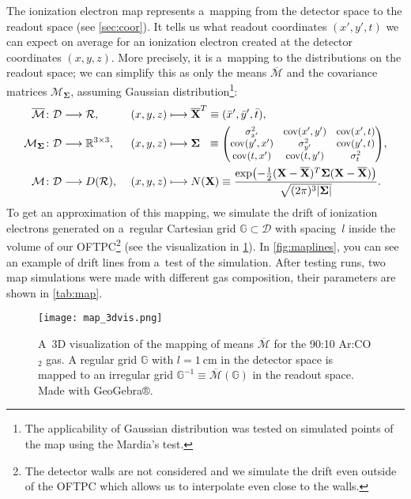 		The ionization electron map represents a~mapping from the detector space to the readout space (see \cref{sec:coor}). It tells us what readout coordinates $(x',y',t)$ we can expect on average for an ionization electron created at the detector coordinates $(x,y,z)$. More precisely, it is a~mapping to the distributions on the readout space; we can simplify this as only the means $\overline{\mathcal{M}}$ and the covariance matrices $\mathcal{M}_\mathbf{\Sigma}$, assuming Gaussian distribution\footnote{The applicability of Gaussian distribution was tested on simulated points of the map using the Mardia's test.}:
			\begin{alignat}{3}
				\overline{\mathcal{M}}&\colon \mathcal{D} \longrightarrow \mathcal{R}, &&(x,y,z) \longmapsto \mathbf{\overline{X}}^T\equiv(\bar{x}',\bar{y}',\bar{t}),\\
				\mathcal{M}_\mathbf{\Sigma}&\colon \mathcal{D} \longrightarrow \mathbb{R}^{3\times3}, &&(x,y,z) \longmapsto \mathbf{\Sigma}^{\phantom{T}} \equiv \scalebox{0.9}{$\begin{pmatrix}
					\sigma_{x'}^2 & \operatorname{cov}(x',y') & \operatorname{cov}(x',t) \\
					\operatorname{cov}(y',x') & \sigma_{y'}^2 & \operatorname{cov}(y',t) \\
					\operatorname{cov}(t,x') & \operatorname{cov}(t,y') & \sigma_{t}^2
				\end{pmatrix}$},\\
				\mathcal{M}&\colon \mathcal{D} \longrightarrow D(\mathcal{R}),\ &&(x,y,z) \longmapsto N(\mathbf{X}) \equiv \frac{\exp(-\frac{1}{2}(\mathbf{X}-\mathbf{\overline{X}})^T\mathbf{\Sigma}(\mathbf{X}-\mathbf{\overline{X}}))}{\sqrt{(2\pi)^3 |\mathbf{\Sigma}|}}.
			\end{alignat}
		To get an approximation of this mapping, we simulate the drift of ionization electrons generated on a~regular Cartesian grid $\mathbb{G}\subset\mathcal{D}$ with spacing~$l$ inside the volume of our \ac{OFTPC}\footnote{The detector walls are not considered and we simulate the drift even outside of the \ac{OFTPC} which allows us to interpolate even close to the walls.} (see the visualization in \cref{fig:map_3d}). In \cref{fig:maplines}, you can see an example of drift lines from a~test of the simulation. After testing runs, two map simulations were made with different gas composition, their parameters are shown in \cref{tab:map}. 
		
		\begin{figure}
			\centering
			\texttt{[image: map\_3dvis.png]}
			\caption{A~3D visualization of the mapping of means $\overline{\mathcal{M}}$ for the 90:10 Ar:CO$_2$ gas. A regular grid $\mathbb{G}$ with $l = \qty{1}{\centi\meter}$ in the detector space is mapped to an irregular grid $\mathbb{G}^{-1} \equiv \overline{\mathcal{M}}(\mathbb{G})$ in the readout space. Made with GeoGebra®.}
			\label{fig:map_3d}
		\end{figure}
		
